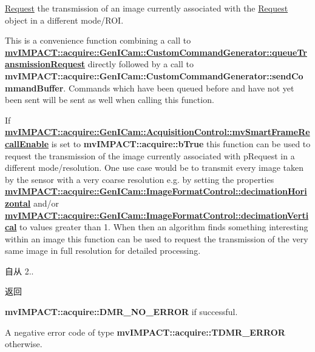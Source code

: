 \hyperlink{classmv_i_m_p_a_c_t_1_1acquire_1_1_request}{Request} the transmission of an image currently associated with the \hyperlink{classmv_i_m_p_a_c_t_1_1acquire_1_1_request}{Request} object in a different mode/\+R\+O\+I. 

This is a convenience function combining a call to {\bfseries \hyperlink{classmv_i_m_p_a_c_t_1_1acquire_1_1_gen_i_cam_1_1_custom_command_generator_a807c3f7b8eb9b6392035e97967116250}{mv\+I\+M\+P\+A\+C\+T\+::acquire\+::\+Gen\+I\+Cam\+::\+Custom\+Command\+Generator\+::queue\+Transmission\+Request}} directly followed by a call to {\bfseries mv\+I\+M\+P\+A\+C\+T\+::acquire\+::\+Gen\+I\+Cam\+::\+Custom\+Command\+Generator\+::send\+Command\+Buffer}. Commands which have been queued before and have not yet been sent will be sent as well when calling this function.

If {\bfseries \hyperlink{classmv_i_m_p_a_c_t_1_1acquire_1_1_gen_i_cam_1_1_acquisition_control_aeb86056e3eb76d5c80c4048ac9ba10d5}{mv\+I\+M\+P\+A\+C\+T\+::acquire\+::\+Gen\+I\+Cam\+::\+Acquisition\+Control\+::mv\+Smart\+Frame\+Recall\+Enable}} is set to {\bfseries mv\+I\+M\+P\+A\+C\+T\+::acquire\+::b\+True} this function can be used to request the transmission of the image currently associated with {\ttfamily p\+Request} in a different mode/resolution. One use case would be to transmit every image taken by the sensor with a very coarse resolution e.\+g. by setting the properties {\bfseries \hyperlink{classmv_i_m_p_a_c_t_1_1acquire_1_1_gen_i_cam_1_1_image_format_control_af3c2ae5e5f9aaea7a762f3cd10ce1ebb}{mv\+I\+M\+P\+A\+C\+T\+::acquire\+::\+Gen\+I\+Cam\+::\+Image\+Format\+Control\+::decimation\+Horizontal}} and/or {\bfseries \hyperlink{classmv_i_m_p_a_c_t_1_1acquire_1_1_gen_i_cam_1_1_image_format_control_aee18567f6502e019607cab86903a68af}{mv\+I\+M\+P\+A\+C\+T\+::acquire\+::\+Gen\+I\+Cam\+::\+Image\+Format\+Control\+::decimation\+Vertical}} to values greater than 1. When then an algorithm finds something interesting within an image this function can be used to request the transmission of the very same image in full resolution for detailed processing.

\begin{DoxySince}{自从}
2.. 
\end{DoxySince}
\begin{DoxyReturn}{返回}

\begin{DoxyItemize}
\item {\bfseries mv\+I\+M\+P\+A\+C\+T\+::acquire\+::\+D\+M\+R\+\_\+\+N\+O\+\_\+\+E\+R\+R\+O\+R} if successful.
\item A negative error code of type {\bfseries mv\+I\+M\+P\+A\+C\+T\+::acquire\+::\+T\+D\+M\+R\+\_\+\+E\+R\+R\+O\+R} otherwise. 
\end{DoxyItemize}
\end{DoxyReturn}

